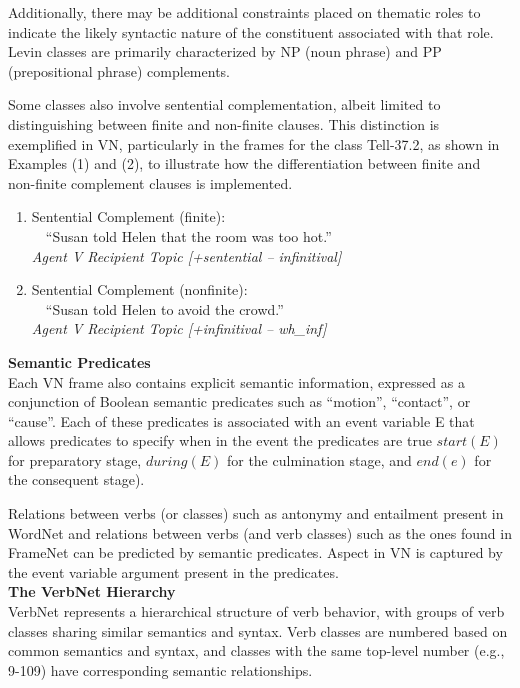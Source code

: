 Additionally, there may be additional constraints placed on thematic roles to indicate the likely syntactic nature of the constituent associated with that role.
Levin classes are primarily characterized by NP (noun phrase) and PP (prepositional phrase) complements. 

Some classes also involve sentential complementation, albeit limited to distinguishing between finite and non-finite clauses. This distinction is exemplified in VN, particularly in the frames for the class Tell-37.2, as shown in Examples (1) and (2), to illustrate how the differentiation between finite and non-finite complement clauses is implemented.
\begin{enumerate}
\item Sentential Complement (ﬁnite): \\ \ \ \enquote{Susan told Helen that the room was too hot.} \\ \emph{Agent V Recipient Topic [+sentential – infinitival]}
\item Sentential Complement (nonﬁnite): \\ \ \  \enquote{Susan told Helen to avoid the crowd.}\\ \emph{Agent V Recipient Topic [+inﬁnitival – wh\_inf]}
\end{enumerate}
\textbf{Semantic Predicates}\\ 
Each VN frame also contains explicit semantic information, expressed as a conjunction of Boolean semantic predicates such as \enquote{motion}, \enquote{contact}, or \enquote{cause}. Each of these predicates is associated with an event variable E that allows predicates to specify when in the event the predicates are true $start(E)$ for preparatory stage, $during(E)$ for the culmination stage, and $end(e)$ for the consequent stage). 

Relations between verbs (or classes) such as antonymy and entailment present in WordNet and relations between verbs (and verb classes) such as the ones found in FrameNet can be predicted by semantic predicates. Aspect in VN is captured by the event variable argument present in the predicates.\\ 
\textbf{The VerbNet Hierarchy}\\ 
VerbNet represents a hierarchical structure of verb behavior, with groups of verb classes sharing similar semantics and syntax. Verb classes are numbered based on common semantics and syntax, and classes with the same top-level number (e.g., 9-109) have corresponding semantic relationships. 

